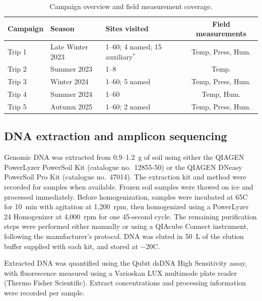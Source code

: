 \begin{revision}
\begin{table}[h]
  \centering
  \caption{Campaign overview and field measurement coverage.}
  \label{tab:env_summary}
  \small
  \setlength{\tabcolsep}{2.5pt}
  \begin{tabular}{lllc}
    \toprule
    Campaign & Season & Sites visited & Field measurements \\
    \midrule
    Trip 1 & Late Winter 2023 & 1--60; 4 named; 15 auxiliary$^\ast$ & Temp, Press, Hum. \\
    Trip 2 & Summer 2023 & 1--8 & Temp. \\
    Trip 3 & Winter 2024 & 1--60; 5 named & Temp, Press, Hum. \\
    Trip 4 & Summer 2024 & 1--60 & Temp, Hum. \\
    Trip 5 & Autumn 2025 & 1--60; 2 named & Temp, Press, Hum. \\
    \bottomrule
  \end{tabular}\par
\end{table}

\subsection{DNA extraction and amplicon sequencing}
Genomic DNA was extracted from 0.9--1.2~g of soil using either the
QIAGEN PowerLyzer PowerSoil Kit (catalogue no.\ 12855-50) or the QIAGEN
DNeasy PowerSoil Pro Kit (catalogue no.\ 47014). The extraction kit and method were recorded for samples when available. Frozen soil samples were thawed on ice and processed immediately. Before homogenization, samples were incubated at 65\degree C for 10~min with agitation at 1,200~rpm, then homogenized using a PowerLyzer 24 Homogenizer at 4,000~rpm for one 45-second cycle. The remaining purification steps were performed either
manually or using a QIAcube Connect instrument, following the
manufacturer's protocol. DNA was eluted in 50~\textmu L of the elution
buffer supplied with each kit, and stored at $-20$\degree C.

Extracted DNA was quantified using the Qubit dsDNA High Sensitivity
assay, with fluorescence measured using a Varioskan LUX multimode
plate reader (Thermo Fisher Scientific). Extract concentrations and processing information were recorded per sample.


\end{revision}
